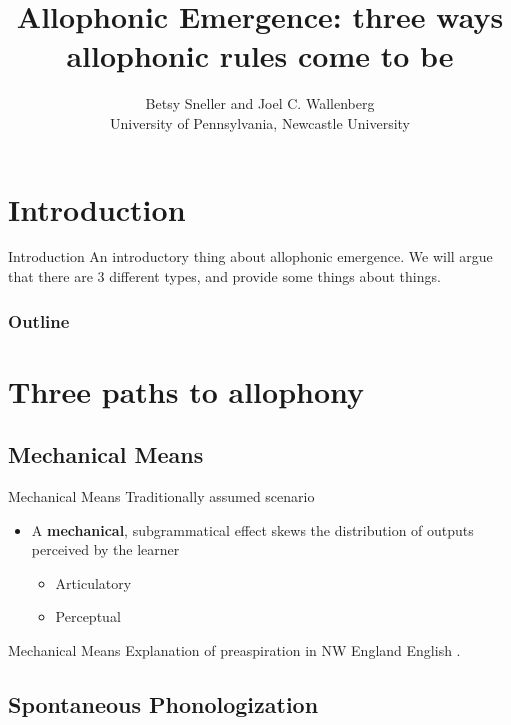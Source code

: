 \documentclass[hyperref={pdfpagelabels=false}]{beamer}
\title{Allophonic Emergence: three ways allophonic rules come to be}
\author{Betsy Sneller and Joel C. Wallenberg \\ University of Pennsylvania, Newcastle University}
\institute{}
\begin{document}
\begin{frame}[plain]
\titlepage
\end{frame}

\section{Introduction}
\begin{frame}{Introduction}
	An introductory thing about allophonic emergence. We will argue that there are 3 different types, and provide some things about things.
			
\end{frame}

\begin{frame}
\frametitle{Outline}
\tableofcontents
\end{frame}

\section{Three paths to allophony}
\subsection{Mechanical Means}

\begin{frame}{Mechanical Means}
	Traditionally assumed scenario \cite{ohala1983, ohala1989} \\
	\begin{itemize}
		\item A \textbf{mechanical}, subgrammatical effect skews the distribution of outputs perceived by the learner 
		\begin{itemize}
			\item Articulatory
			\item Perceptual
		\end{itemize}
	\end{itemize}
\end{frame}

\begin{frame}{Mechanical Means}
Explanation of preaspiration in NW England English \citep{Hejna2014}.

\end{frame}

\subsection{Spontaneous Phonologization}
\end{document}
